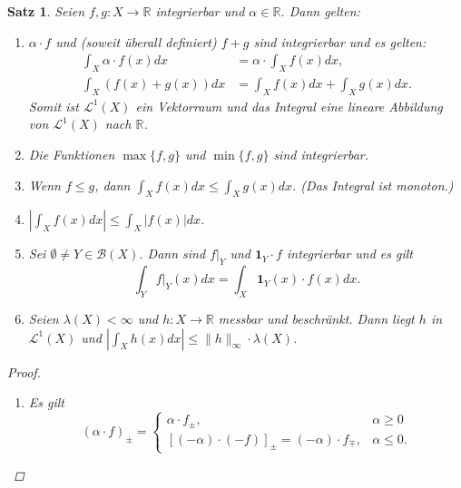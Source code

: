 \documentclass[a4paper]{report}
\newcommand{\doubleOne}{\textbf{1}}
\newcommand{\R}{\mathbb{R}}
\newcommand{\Borel}{\mathcal{B}}
\newcommand{\Leb}{\mathcal{L}}
\newcommand{\jlabel}[1]{\label{j_#1}}
\newcommand{\jabb}[3]{ #1: #2 \rightarrow #3 }
\theoremstyle{plain}
\newtheorem{satz}[thm]{Satz}
\theoremstyle{definition}
\begin{document}
{{{{\begin{satz}
\jlabel{Satz 2.25}
    Seien $\jabb{f,g}{X}{\R}$ integrierbar und $\alpha \in \R$. Dann gelten:
    \begin{enumerate}
        \item 
            $\alpha\cdot f$ und (soweit überall definiert) $f+g$ sind integrierbar und es gelten:
            \begin{displaymath}
                \begin{split}
                    \int_X \alpha \cdot f(x) dx &= \alpha\cdot \int_X f(x) dx,\\
                    \int_X (f(x) + g(x)) dx &= \int_X f(x)dx + \int_X g(x) dx.
                \end{split}
            \end{displaymath}
            Somit ist $\Leb^1(X)$ ein Vektorraum und das Integral eine lineare Abbildung von $\Leb^1(X)$ nach $\R$.
        \item Die Funktionen $\max\{f,g\}$ und $\min\{f,g\}$ sind integrierbar.
        \item Wenn $f\le g$, dann $\int_X f(x)dx \le \int_X g(x) dx$. (Das Integral ist monoton.)
        \item $|\int_X f(x)dx| \le \int_X |f(x)| dx$.
        \item
            Sei $\emptyset \ne Y \in \Borel(X)$. Dann sind $f|_Y$ und $\doubleOne_Y\cdot f$ integrierbar und es gilt
            \begin{displaymath}
                \int_Y f|_Y(x) dx = \int_X \doubleOne_Y (x) \cdot f(x) dx.
            \end{displaymath}
        \item
            Seien $\lambda(X) < \infty$ und $\jabb{h}{X}{\R}$ messbar und beschränkt. Dann liegt $h$ in $\Leb^1(X)$ und $|\int_X h(x) dx| \le \lVert h \rVert_\infty \cdot \lambda(X)$.
    \end{enumerate}
    \begin{proof}
        \begin{enumerate}
            \item 
                Es gilt
                \begin{displaymath}
                    (\alpha\cdot f)_\pm = \begin{cases}
                                              \alpha \cdot f_\pm, &\alpha \ge 0\\
                                              [(-\alpha)\cdot (-f)]_\pm = (-\alpha)\cdot f_\mp, &\alpha \le 0.

\end{cases}
\end{displaymath}
\end{enumerate}
\end{proof}
\end{satz}}}}}
\end{document}
